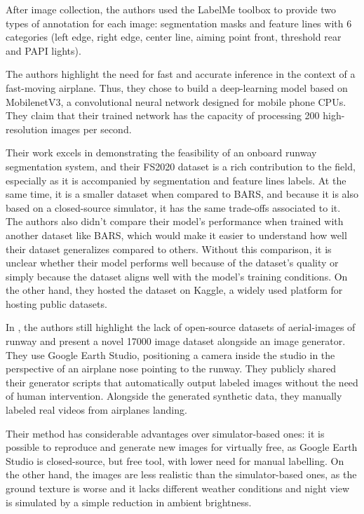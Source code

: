After image collection, the authors used the LabelMe toolbox to provide two types of annotation for each image: segmentation masks and feature lines with 6 categories (left edge, right edge, center line, aiming point front, threshold rear and PAPI lights).

The authors highlight the need for fast and accurate inference in the context of a fast-moving airplane. Thus, they chose to build a deep-learning model based on MobilenetV3, a convolutional neural network designed for mobile phone CPUs. They claim that their trained network has the capacity of processing 200 high-resolution images per second.

Their work excels in demonstrating the feasibility of an onboard runway
segmentation system, and their FS2020 dataset is a rich contribution to the
field, especially as it is accompanied by segmentation and feature lines labels.
At the same time, it is a smaller dataset when compared to BARS, and because it
is also based on a closed-source simulator, it has the same trade-offs
associated to it. The authors also didn't compare their model's performance when
trained with another dataset like BARS, which would make it easier to understand
how well their dataset generalizes compared to others. Without this comparison,
it is unclear whether their model performs well because of the dataset's quality
or simply because the dataset aligns well with the model's training conditions.
On the other hand, they hosted the dataset on Kaggle, a widely used platform for hosting public datasets.

In \cite{ducoffe_lard_2023}, the authors still highlight the lack of open-source datasets of aerial-images of runway and present a novel 17000 image dataset alongside an image generator. They use Google Earth Studio, positioning a camera inside the studio in the perspective of an airplane nose pointing to the runway. They publicly shared their generator scripts that automatically output labeled images without the need of human intervention. Alongside the generated synthetic data, they manually labeled real videos from airplanes landing.

Their method has considerable advantages over simulator-based ones: it is
possible to reproduce and generate new images for virtually free, as Google
Earth Studio is closed-source, but free tool, with lower need for manual
labelling. On the other hand, the images are less realistic than the simulator-based ones, as the ground texture is worse and it lacks different weather conditions and night view is simulated by a simple reduction in ambient brightness.


